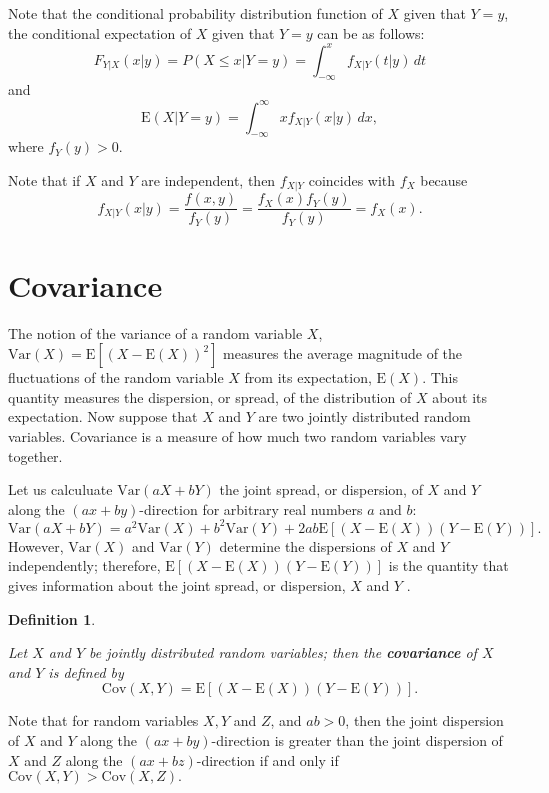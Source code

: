 \documentclass[
]{book}
\theoremstyle{definition}
\newtheorem{definition}{Definition}[chapter]
\theoremstyle{definition}
\theoremstyle{definition}
\theoremstyle{definition}
\theoremstyle{remark}
\begin{document}
Note that the conditional probability distribution function of \(X\) given
that \(Y = y\), the conditional expectation of \(X\) given that \(Y = y\) can
be as follows:
\[F_{Y|X}(x|y) = P(X \le x | Y = y) = \int_ {-\infty}^x f_{X|Y}(t|y) \, dt\]
and
\[\mathrm{E}(X|Y = y) =  \int_{-\infty}^{\infty} x  f_{X|Y}(x|y) \, dx,\]
where \(f_Y(y) > 0\).

Note that if \(X\) and \(Y\) are independent, then \(f_{X|Y}\) coincides with
\(f_X\) because
\[f_{X|Y}(x|y) = \frac{f(x,y)}{f_Y(y)} =\frac{f_X(x)f_Y(y)}{f_Y(y)} = f_X(x).\]

\hypertarget{covariance}{%
\section{Covariance}\label{covariance}}

The notion of the variance of a random variable \(X\),
\(\mathrm{Var}(X) = \mathrm{E}[ ( X - \mathrm{E}(X))^2]\) measures the
average magnitude of the fluctuations of the random variable \(X\) from
its expectation, \(\mathrm{E}(X)\). This quantity measures the dispersion,
or spread, of the distribution of \(X\) about its expectation. Now suppose
that \(X\) and \(Y\) are two jointly distributed random variables.
Covariance is a measure of how much two random variables vary together.

Let us calculuate \(\mathrm{Var}(aX + bY)\) the joint spread, or
dispersion, of \(X\) and \(Y\) along the \((ax + by)\)-direction for arbitrary
real numbers \(a\) and \(b\):
\[\mathrm{Var}(aX + bY) = a^2 \mathrm{Var}(X) + b^2 \mathrm{Var}(Y) + 2 a b \mathrm{E}[(X - \mathrm{E}(X))(Y - \mathrm{E}(Y))].\]
However, \(\mathrm{Var}(X)\) and \(\mathrm{Var}(Y )\) determine the
dispersions of \(X\) and \(Y\) independently; therefore,
\(\mathrm{E}[(X - \mathrm{E}(X))(Y - \mathrm{E}(Y))]\) is the quantity
that gives information about the joint spread, or dispersion, \(X\) and
\(Y\) .

\begin{definition}
\protect\hypertarget{def:unlabeled-div-25}{}\label{def:unlabeled-div-25}

\emph{Let \(X\) and \(Y\) be jointly distributed random
variables; then the \textbf{covariance} of \(X\) and \(Y\) is defined by
\[\mathrm{Cov}(X,Y) =  \mathrm{E}[(X - \mathrm{E}(X))(Y - \mathrm{E}(Y))].\]}

\end{definition}

Note that for random variables \(X, Y\) and \(Z\), and \(ab > 0\), then the
joint dispersion of \(X\) and \(Y\) along the \((ax + by)\)-direction is
greater than the joint dispersion of \(X\) and \(Z\) along the
\((ax + bz)\)-direction if and only if
\(\mathrm{Cov}(X, Y) > \mathrm{Cov}(X,Z).\)
\end{document}
